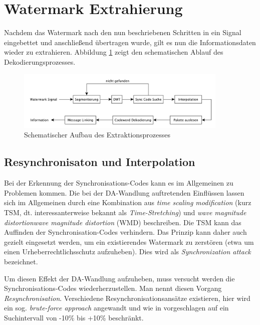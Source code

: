 
\newpage

\section{Watermark Extrahierung}
\label{sec:extraction}

Nachdem das Watermark nach den nun beschriebenen Schritten in ein Signal eingebettet und anschließend übertragen wurde, gilt es nun die Informationsdaten wieder zu extrahieren. Abbildung \ref{fig:diagram-decoder} zeigt den schematischen Ablauf des Dekodierungsprozesses.

\begin{figure}[h]
	\centering
	\includegraphics[width=0.9\textwidth]{figures/diagram-decoder-v2.pdf}
	\caption{Schematischer Aufbau des Extraktionsprozesses}
	\label{fig:diagram-decoder}
\end{figure}


\subsection{Resynchronisaton und Interpolation}

Bei der Erkennung der Synchronisations-Codes kann es im Allgemeinen zu Problemen kommen. Die bei der DA-Wandlung auftretenden Einflüssen lassen sich im Allgemeinen durch eine Kombination aus \textit{time scaling modification} (kurz TSM, dt. interessanterweise bekannt als \textit{Time-Stretching}) und \textit{wave magnitude
distortion}\textit{wave magnitude
distortion} (WMD) beschreiben\cite{xiang2007robust}\cite{steinebach2002audio}. Die TSM kann das Auffinden der Synchronisation-Codes verhindern. Das Prinzip kann daher auch gezielt eingesetzt werden, um ein existierendes Watermark zu zerstören (etwa um einen Urheberrechtlichsschutz aufzuheben). Dies wird als \textit{Synchronization attack} bezeichnet.

Um diesen Effekt der DA-Wandlung aufzuheben, muss versucht werden die Synchron\-isations\--Codes wieder\-herzustellen. Man nennt diesen Vorgang \textit{Resynchronisation}. Verschiedene Resynchronisationsansätze existieren, hier wird ein sog. \textit{brute-force approach} angewandt und wie in \cite{steinebach2011re} vorgeschlagen auf ein Suchintervall von -10\% bis +10\% beschränkt. 

